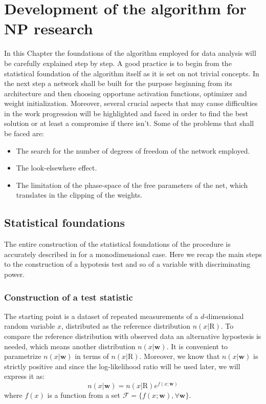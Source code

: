 \chapter{Development of the algorithm for NP research}
\label{chap:Z_5D}





In this Chapter the foundations of the algorithm employed for data analysis will be carefully explained step by step. A good practice is to begin from the statistical foundation of the algorithm itself as it is set on not trivial concepts. In the next step a network shall be built for the purpose beginning from its architecture and then choosing opportune activation functions, optimizer and weight initialization. Moreover, several crucial aspects that may cause difficulties in the work progression will be highlighted and faced in order to find the best solution or at least a compromise if there isn't. Some of the problems that shall be faced are:
\begin{itemize}
	\item The search for the number of degrees of freedom of the network employed.
	\item The look-elsewhere effect.
	\item The limitation of the phase-space of the free parameters of the net, which translates in the clipping of the weights.
\end{itemize}





\section{Statistical foundations}
The entire construction of the statistical foundations of the procedure is accurately described in \cite{wulzer} for a monodimensional case. Here we recap the main steps to the construction of a hypotesis test and so of a variable with discriminating power.



\subsection{Construction of a test statistic}
The starting point is a dataset of repeated measurements of a $d$-dimensional random variable $x$, distributed as the reference distribution $n(x|\mathrm{R})$. To compare the reference distribution with observed data an alternative hypostesis is needed, which means another distribution $n(x|\mathbf{w})$. It is convenient to parametrize $n(x|\mathbf{w})$ in terms of $n(x|\mathrm{R})$. Moreover, we know that $n(x|\mathbf{w})$ is strictly positive and since the log-likelihood ratio will be used later, we will express it as:
\begin{equation}
	n(x|\mathbf{w}) = n(x|\mathrm{R}) e^{f(x;\mathbf{w})}
\end{equation}
where $f(x)$ is a function from a set $\mathcal{F} = \{ f(x;\mathbf{w}), \forall \mathbf{w} \}$.

